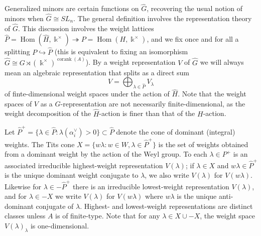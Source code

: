 \documentclass[12pt]{amsart}
\newcommand{\kk}{\Bbbk}%
\newcommand\onto{\twoheadrightarrow}
\newcommand\into{\hookrightarrow}
\DeclareMathOperator{\Hom}{Hom}
\DeclareMathOperator{\corank}{corank}
\theoremstyle{remark}
\numberwithin{equation}{section}
\begin{document}
Generalized minors are certain functions on $\widehat{G}$, recovering the usual notion of minors when $\widehat{G} \cong SL_n$. 
The general definition involves the representation theory of $\widehat{G}$. This discussion involves the weight lattices $\widehat{P} = \Hom(\widehat{H},\kk^\times) \onto P = \Hom(H,\kk^\times)$, and we fix once and for all a splitting $P \into \widehat{P}$ (this is equivalent to fixing an isomorphism $\widehat{G} \cong G \rtimes (\kk^\times)^{\corank(A)}$). 
By a weight representation $V$ of $\widehat{G}$ we will always mean an algebraic representation that splits as a direct sum
\[
V = \bigoplus_{\lambda \in \widehat{P}} V_\lambda
\]
of finte-dimensional weight spaces under the action of $\widehat{H}$. Note that the weight spaces of $V$ as a $G$-representation are not necessarily finite-dimensional, as the weight decomposition of the $\widehat{H}$-action is finer than that of the $H$-action. 



Let $\widehat{P}^+=\{\lambda \in \widehat{P}: \lambda(\alpha_i^\vee)>0\} \subset \widehat{P}$ denote the cone of dominant (integral) weights. 
The Tits cone $X = \{w\lambda : w \in W, \lambda \in \widehat{P}^+\}$ is the set of weights obtained from a dominant weight by the action of the Weyl group. To each $\lambda \in P^+$ is an associated irreducible highest-weight representation $V(\lambda)$; if $\lambda \in X$ and $w \lambda \in \widehat{P}^+$ is the unique dominant weight conjugate to $\lambda$, we also write $V(\lambda)$ for $V(w \lambda)$. Likewise for $\lambda \in -\widehat{P}^+$ there is an irreducible lowest-weight representation $V(\lambda)$, and for $\lambda \in -X$ we write $V(\lambda)$ for $V(w\lambda)$ where $w\lambda$ is the unique anti-dominant conjugate of $\lambda$. Highest- and lowest-weight representations are distinct classes unless $A$ is of finite-type. Note that for any $\lambda \in X \cup -X$, the weight space $V(\lambda)_\lambda$ is one-dimensional.
\end{document}
